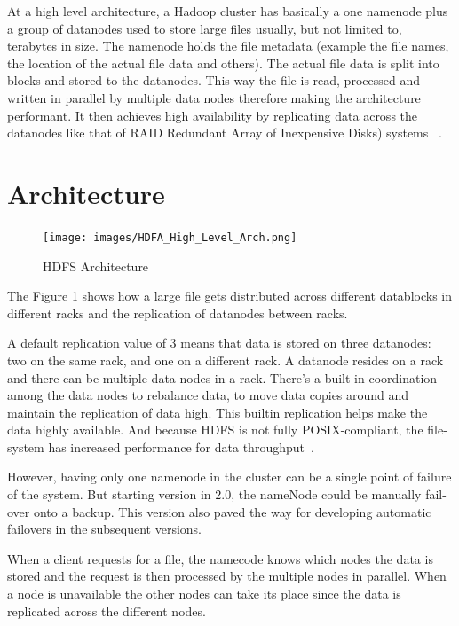 At a high level architecture, a Hadoop cluster has basically a one
namenode plus a group of datanodes used to store large files usually,
but not limited to, terabytes in size. The namenode holds the file
metadata (example the file names, the location of the actual file data
and others). The actual file data is split into blocks and stored to
the datanodes. This way the file is read, processed and written in
parallel by multiple data nodes therefore making the architecture
performant. It then achieves high availability by replicating data
across the datanodes like that of RAID Redundant Array of Inexpensive
Disks) systems ~\cite{hid-sp18-506-hdfs}.
 
\section{Architecture} 

\begin{figure}[!ht]
\centering\texttt{[image: images/HDFA\_High\_Level\_Arch.png]}
  \caption{HDFS Architecture}\label{f:hdfs-level-arch}
\end{figure}

The Figure 1 shows how a large file gets distributed across different
datablocks in different racks and the replication of datanodes between
racks.
 
A default replication value of 3 means that data is stored on three
datanodes: two on the same rack, and one on a different rack. A
datanode resides on a rack and there can be multiple data nodes in a
rack. There's a built-in coordination among the data nodes to
rebalance data, to move data copies around and maintain the
replication of data high. This builtin replication helps make the data
highly available. And because HDFS is not fully POSIX-compliant, the
file-system has increased performance for data
throughput~\cite{hid-sp18-506-hdfs2}.

However, having only one namenode in the cluster can be a single point
of failure of the system. But starting version in 2.0, the nameNode
could be manually fail-over onto a backup. This version also paved the
way for developing automatic failovers in the subsequent versions.

When a client requests for a file, the namecode knows which nodes the
data is stored and the request is then processed by the multiple nodes
in parallel. When a node is unavailable the other nodes can take its
place since the data is replicated across the different nodes.


